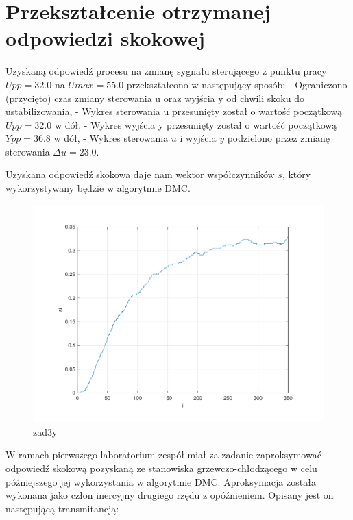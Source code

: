 \section{Przekształcenie otrzymanej odpowiedzi skokowej}

Uzyskaną odpowiedź procesu na zmianę sygnału sterującego z punktu pracy $Upp=\num{32.0}$ na $Umax=\num{55.0}$ przekształcono w następujący sposób:\newline
\indent - Ograniczono (przycięto) czas zmiany sterowania u oraz wyjścia y od chwili skoku do ustabilizowania,\newline
\indent - Wykres sterowania u przesunięty został o wartość początkową $Upp=\num{32.0}$ w dół,\newline
\indent - Wykres wyjścia y przesunięty został o wartość początkową $Ypp=\num{36.8}$ w dół,\newline
\indent - Wykres sterowania $u$ i wyjścia $y$ podzielono przez zmianę sterowania $\Delta u=\num{23.0}$.

Uzyskana odpowiedź skokowa daje nam wektor współczynników $s$,
który wykorzystywany będzie w algorytmie DMC.

\begin{figure}[H]
    \centering
    \includegraphics[scale=0.75]{../lab/zad_3/zad3s.pdf}
    \caption{zad3y}
\end{figure}

W ramach pierwszego laboratorium zespół miał za zadanie 
zaproksymować odpowiedź skokową pozyskaną ze stanowiska grzewczo-chłodzącego w celu 
późniejszego jej wykorzystania w algorytmie DMC. 
Aproksymacja została wykonana jako człon inercyjny drugiego rzędu z opóźnieniem. 
Opisany jest on następującą transmitancją: 

